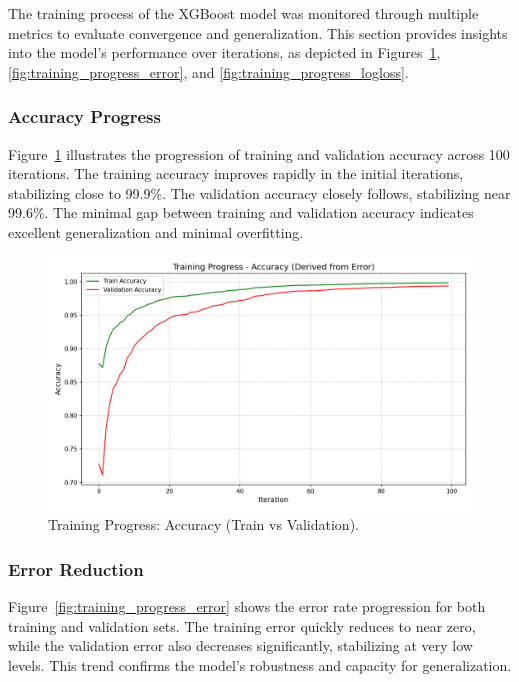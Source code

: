 \documentclass[
    13pt, %
    a4paper, %
    listof=totoc, %
    bibliography=totoc, %
    index=totoc, %
    headsepline
]{scrreprt}
\begin{document}
The training process of the XGBoost model was monitored through multiple metrics to evaluate convergence and generalization. This section provides insights into the model's performance over iterations, as depicted in Figures~\ref{fig:training_progress_accuracy}, \ref{fig:training_progress_error}, and \ref{fig:training_progress_logloss}.

\subsubsection{Accuracy Progress}
\noindent
Figure~\ref{fig:training_progress_accuracy} illustrates the progression of training and validation accuracy across 100 iterations. The training accuracy improves rapidly in the initial iterations, stabilizing close to 99.9\%. The validation accuracy closely follows, stabilizing near 99.6\%. The minimal gap between training and validation accuracy indicates excellent generalization and minimal overfitting.

\begin{figure}[H]
    \centering
    \includegraphics[width=\textwidth]{training_progress_accuracy.png}
    \caption{Training Progress: Accuracy (Train vs Validation).}
    \label{fig:training_progress_accuracy}
\end{figure}


\subsubsection{Error Reduction}
\noindent
Figure~\ref{fig:training_progress_error} shows the error rate progression for both training and validation sets. The training error quickly reduces to near zero, while the validation error also decreases significantly, stabilizing at very low levels. This trend confirms the model's robustness and capacity for generalization.
\end{document}

